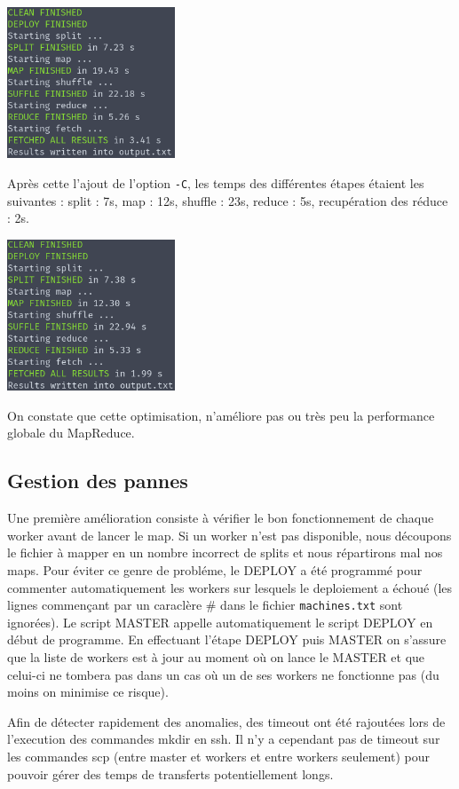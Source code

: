 \documentclass[11pt,a4paper]{article}
\begin{document}
\includegraphics[width=5cm]{screenshot8.png}

Après cette l'ajout de l'option \texttt{-C}, les temps des différentes étapes étaient les suivantes : split : 7s, map : 12s, shuffle : 23s, reduce : 5s, recupération des réduce : 2s.

\includegraphics[width=5cm]{screenshot9.png}

On constate que cette optimisation, n'améliore pas ou très peu la performance globale du MapReduce.

\subsection*{Gestion des pannes}
Une première amélioration consiste à vérifier le bon fonctionnement de chaque worker avant de lancer le map. Si un worker n'est pas disponible, nous découpons le fichier à mapper en un nombre incorrect de splits et nous répartirons mal nos maps. Pour éviter ce genre de probléme, le DEPLOY a été programmé pour commenter automatiquement les workers sur lesquels le deploiement a échoué (les lignes commençant par un caraclère \# dans le fichier \texttt{machines.txt} sont ignorées). Le script MASTER appelle automatiquement le script DEPLOY en début de programme. En effectuant l'étape DEPLOY puis MASTER on s'assure que la liste de workers est à jour au moment où on lance le MASTER et que celui-ci ne tombera pas dans un cas où un de ses workers ne fonctionne pas (du moins on minimise ce risque).

Afin de détecter rapidement des anomalies, des timeout ont été rajoutées lors de l'execution des commandes mkdir en ssh. Il n'y a cependant pas de timeout sur les commandes scp (entre master et workers et entre workers seulement) pour pouvoir gérer des temps de transferts potentiellement longs.
\end{document}

